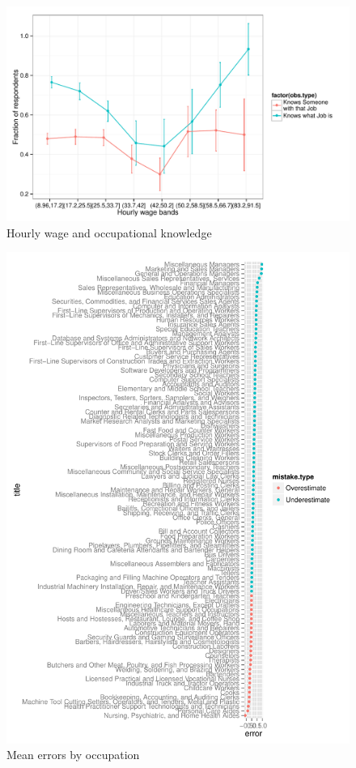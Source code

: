 \documentclass[11pt]{article}
\begin{document}
\begin{figure}
\caption{Hourly wage and occupational knowledge \label{fig:knowledge_by_wage}} 
\centering
\begin{minipage}{0.95 \linewidth}
\includegraphics[width = \linewidth]{./plots/knowledge_by_wage.pdf}
\end{minipage}  
\end{figure} 

\begin{figure}
\caption{Mean errors by occupation \label{fig:errors}} 
\centering
\begin{minipage}{0.95 \linewidth}
\includegraphics[width = \linewidth]{./plots/error_type.pdf}
\end{minipage}  
\end{figure} 
\end{document}

